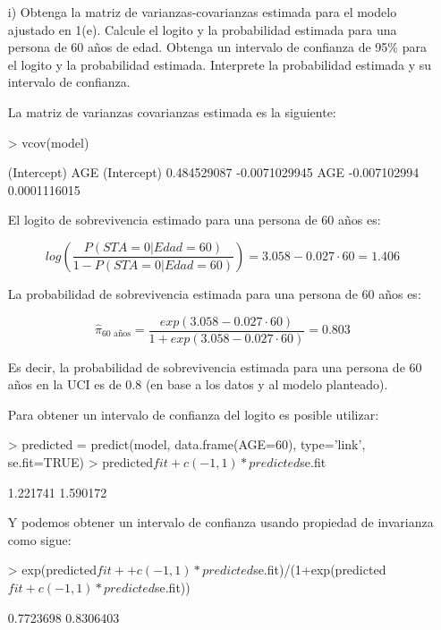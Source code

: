 \documentclass[11pt,onside]{article}
\begin{document}
\begin{itemize}
\item[i)] Obtenga la matriz de varianzas-covarianzas estimada para el modelo ajustado en 1(e). Calcule el logito y la probabilidad estimada para una persona de 60 años de edad. Obtenga un intervalo de confianza de 95\% para el logito y la probabilidad estimada. Interprete la probabilidad estimada y su intervalo de confianza.


La matriz de varianzas covarianzas estimada es la siguiente:

\begin{Schunk}
\begin{Sinput}
> vcov(model)
\end{Sinput}
\begin{Soutput}
             (Intercept)           AGE
(Intercept)  0.484529087 -0.0071029945
AGE         -0.007102994  0.0001116015
\end{Soutput}
\end{Schunk}

El logito de sobrevivencia estimado para una persona de 60 años es:

$$log \left( \frac{P(STA=0|Edad=60)}{1-P(STA=0|Edad=60)} \right)=3.058-0.027\cdot 60=1.406$$ 

La probabilidad de sobrevivencia estimada para una persona de 60 años es:

$$\hat{\pi}_{\text{60 años}}=\frac{exp(3.058-0.027\cdot 60)} {1+exp(3.058-0.027\cdot 60)}=0.803$$

Es decir, la probabilidad de sobrevivencia estimada para una persona de 60 años en la UCI es de 0.8 (en base a los datos y al modelo planteado).

Para obtener un intervalo de confianza del logito es posible utilizar:

\begin{Schunk}
\begin{Sinput}
> predicted = predict(model, data.frame(AGE=60), type='link', se.fit=TRUE) 
> predicted$fit+c(-1,1)*predicted$se.fit
\end{Sinput}
\begin{Soutput}
[1] 1.221741 1.590172
\end{Soutput}
\end{Schunk}

Y podemos obtener un intervalo de confianza usando propiedad de invarianza como sigue:

\begin{Schunk}
\begin{Sinput}
> exp(predicted$fit+
+     c(-1,1)*predicted$se.fit)/(1+exp(predicted$fit+c(-1,1)*predicted$se.fit))
\end{Sinput}
\begin{Soutput}
[1] 0.7723698 0.8306403
\end{Soutput}
\end{Schunk}


\end{itemize}
\end{document}
